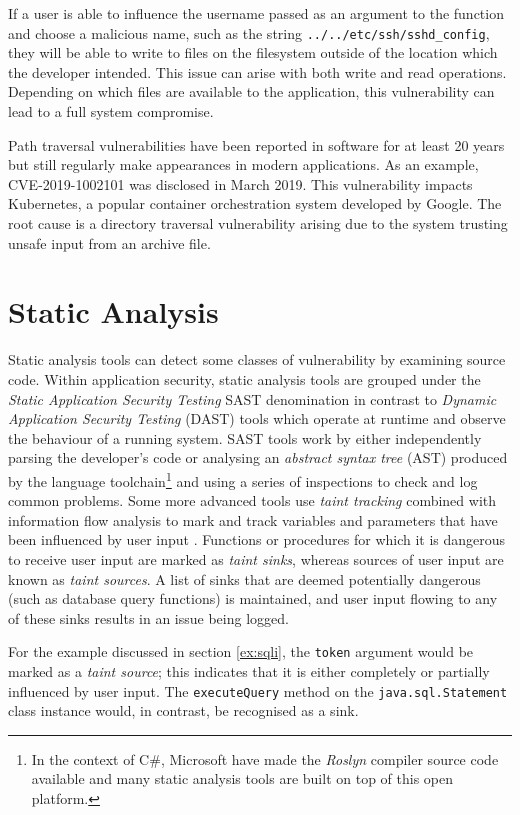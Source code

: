 If a user is able to influence the username passed as an argument to the function and choose a malicious name, such as
the string \texttt{../../etc/ssh/sshd_config}, they will be able to write to files on the filesystem outside of the
location which the developer intended.
This issue can arise with both write and read operations.
Depending on which files are available to the application, this vulnerability can lead to a full system compromise.

Path traversal vulnerabilities have been reported in software for at least 20 years but still regularly make appearances
in modern applications.
As an example, CVE-2019-1002101 was disclosed in March 2019.
This vulnerability impacts Kubernetes, a popular container orchestration system developed by Google.
The root cause is a directory traversal vulnerability arising due to the system trusting unsafe input from an archive
file.

\section{Static Analysis}

Static analysis tools can detect some classes of vulnerability by examining source code.
Within application security, static analysis tools are grouped under the \emph{Static Application Security Testing} SAST
denomination in contrast to \emph{Dynamic Application Security Testing} (DAST) tools which operate at runtime and
observe the behaviour of a running system.
SAST tools work by either independently parsing the developer's code or
analysing an \emph{abstract syntax tree} (AST) produced by the language toolchain\footnote{%
    In the context of C\#, Microsoft have made the \emph{Roslyn} compiler source code available and many static analysis
    tools are built on top of this open platform.}
and using a series of inspections to check and log common problems.
Some more advanced tools use \emph{taint tracking} combined with information flow analysis to mark and track variables
and parameters that have been influenced by user input \citep{denning1977certification}.
Functions or procedures for which it is dangerous to receive user input are marked as \emph{taint sinks}, whereas
sources of user input are known as \emph{taint sources}.
A list of sinks that are deemed potentially dangerous (such as database query functions) is maintained, and user input
flowing to any of these sinks results in an issue being logged.

For the example discussed in section \ref{ex:sqli}, the \texttt{token} argument would be marked as a
\emph{taint source}; this indicates that it is either completely or partially influenced by user input.
The \texttt{executeQuery} method on the \texttt{java.sql.Statement} class instance would, in contrast, be recognised
as a sink.

